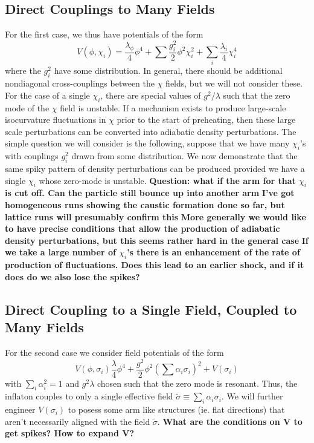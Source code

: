 \documentclass[a4paper,11pt]{article}
\begin{document}
\subsection{Direct Couplings to Many Fields}
For the first case, we thus have potentials of the form
\begin{equation}
  V(\phi,\chi_i) = \frac{\lambda_\phi}{4}\phi^4 + \sum\frac{g_i^2}{2}\phi^2\chi_i^2 + \sum_i\frac{\lambda_i}{4}\chi_i^4 
\end{equation}
where the $g_i^2$ have some distribution.
In general, there should be additional nondiagonal cross-couplings between the $\chi$ fields, but we will not consider these.
For the case of a single $\chi_i$, there are special values of $g^2/\lambda$ such that the zero mode of the $\chi$ field is unstable.
If a mechanism exists to produce large-scale isocurvature fluctuations in $\chi$ prior to the start of preheating, then these large scale perturbations can be converted into adiabatic density perturbations.
The simple question we will consider is the following, suppose that we have many $\chi_i$'s with couplings $g_i^2$ drawn from some distribution.
We now demonstrate that the same spiky pattern of density perturbations can be produced provided we have a single $\chi_i$ whose zero-mode is unstable.
{\bf Question: what if the arm for that $\chi_i$ is cut off.  Can the particle still bounce up into another arm}
{\bf I've got homogeneous runs showing the caustic formation done so far, but lattice runs will presumably confirm this}
{\bf More generally we would like to have precise conditions that allow the production of adiabatic density perturbations, but this seems rather hard in the general case}
{\bf If we take a large number of $\chi_i$'s there is an enhancement of the rate of production of fluctuations.  Does this lead to an earlier shock, and if it does do we also lose the spikes?}

\subsection{Direct Coupling to a Single Field, Coupled to Many Fields}
For the second case we consider field potentials of the form
\begin{equation}
  V(\phi,\sigma_i)  \frac{\lambda}{4}\phi^4 + \frac{g^2}{2}\phi^2\left(\sum \alpha_i\sigma_i \right)^2 + V(\sigma_i)
\end{equation}
with $\sum_i \alpha_i^2 = 1$ and $g^2\lambda$ chosen such that the zero mode is resonant.
Thus, the inflaton couples to only a single effective field $\tilde{\sigma} \equiv \sum_i\alpha_i\sigma_i$.
We will further engineer $V(\sigma_i)$ to posess some arm like structures (ie. flat directions) that aren't necessarily aligned with the field $\tilde{\sigma}$.
{\bf What are the conditions on V to get spikes?  How to expand V?}
\end{document}
